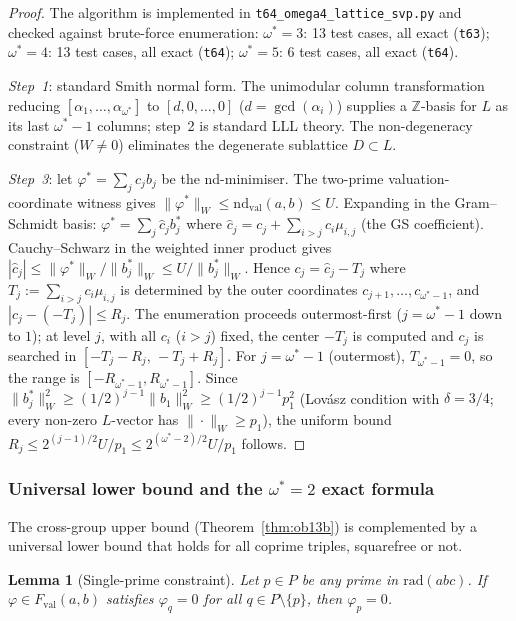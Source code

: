 \documentclass[12pt]{article}
\newtheorem{lemma}[theorem]{Lemma}
\theoremstyle{definition}
\begin{document}
\begin{proof}
The algorithm is implemented in \texttt{t64\_omega4\_lattice\_svp.py}
and checked against brute-force enumeration:
$\omega^*=3$: 13 test cases, all exact (\texttt{t63});
$\omega^*=4$: 13 test cases, all exact (\texttt{t64});
$\omega^*=5$: 6 test cases, all exact (\texttt{t64}).

\emph{Step~1}: standard Smith normal form.
The unimodular column transformation reducing $[\alpha_1,\ldots,\alpha_{\omega^*}]$
to $[d,0,\ldots,0]$ ($d = \gcd(\alpha_i)$) supplies a $\mathbb{Z}$-basis for $L$
as its last $\omega^*-1$ columns; step~2 is standard LLL theory.
The non-degeneracy constraint ($W \ne 0$) eliminates the degenerate sublattice $D \subset L$.

\emph{Step~3}: let $\varphi^* = \sum_j c_j b_j$ be the nd-minimiser.
The two-prime valuation-coordinate witness gives
$\|\varphi^*\|_W\le \mathrm{nd}_{\mathrm{val}}(a,b)\le U$.
Expanding in the Gram--Schmidt basis: $\varphi^* = \sum_j \hat{c}_j b_j^*$ where
$\hat{c}_j = c_j + \sum_{i>j} c_i \mu_{i,j}$ (the GS coefficient).  Cauchy--Schwarz
in the weighted inner product gives
$|\hat{c}_j| \le \|\varphi^*\|_W / \|b_j^*\|_W \le U/\|b_j^*\|_W$.
Hence $c_j = \hat{c}_j - T_j$ where $T_j := \sum_{i>j} c_i \mu_{i,j}$ is
determined by the outer coordinates $c_{j+1},\ldots,c_{\omega^*-1}$, and
$|c_j - (-T_j)| \le R_j$.
The enumeration proceeds outermost-first ($j = \omega^*\!-\!1$ down to $1$);
at level $j$, with all $c_i$ ($i>j$) fixed, the center $-T_j$ is computed and
$c_j$ is searched in $[-T_j - R_j,\,-T_j + R_j]$.
For $j = \omega^*\!-\!1$ (outermost), $T_{\omega^*-1} = 0$, so the range is
$[-R_{\omega^*-1}, R_{\omega^*-1}]$.
Since $\|b_j^*\|_W^2 \ge (1/2)^{j-1}\|b_1\|_W^2 \ge (1/2)^{j-1} p_1^2$ (Lov\'{a}sz
condition with $\delta=3/4$; every non-zero $L$-vector has $\|\cdot\|_W \ge p_1$),
the uniform bound $R_j \le 2^{(j-1)/2} U / p_1 \le 2^{(\omega^*-2)/2} U / p_1$ follows.
\end{proof}

\subsubsection*{Universal lower bound and the $\omega^*=2$ exact formula}

The cross-group upper bound (Theorem~\ref{thm:ob13b}) is complemented by a
universal lower bound that holds for all coprime triples, squarefree or not.

\begin{lemma}[Single-prime constraint]\label{lem:single_prime}
  Let $p \in P$ be any prime in $\mathrm{rad}(abc)$.
  If $\varphi \in F_{\mathrm{val}}(a,b)$ satisfies $\varphi_q = 0$ for all $q \in P \setminus \{p\}$,
  then $\varphi_p = 0$.
\end{lemma}
\end{document}
